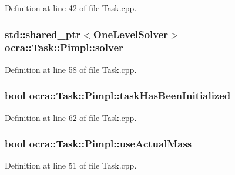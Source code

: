 Definition at line 42 of file Task.\+cpp.

\subsubsection[{\texorpdfstring{solver}{solver}}]{\setlength{\rightskip}{0pt plus 5cm}std\+::shared\+\_\+ptr$<${\bf One\+Level\+Solver}$>$ ocra\+::\+Task\+::\+Pimpl\+::solver}\hypertarget{structocra_1_1Task_1_1Pimpl_af1e09ed90ae5dee85e7fb5bd9d959df7}{}\label{structocra_1_1Task_1_1Pimpl_af1e09ed90ae5dee85e7fb5bd9d959df7}


Definition at line 58 of file Task.\+cpp.

\subsubsection[{\texorpdfstring{task\+Has\+Been\+Initialized}{taskHasBeenInitialized}}]{\setlength{\rightskip}{0pt plus 5cm}bool ocra\+::\+Task\+::\+Pimpl\+::task\+Has\+Been\+Initialized}\hypertarget{structocra_1_1Task_1_1Pimpl_a40e20271ee922933345e452f26569ac1}{}\label{structocra_1_1Task_1_1Pimpl_a40e20271ee922933345e452f26569ac1}


Definition at line 62 of file Task.\+cpp.

\subsubsection[{\texorpdfstring{use\+Actual\+Mass}{useActualMass}}]{\setlength{\rightskip}{0pt plus 5cm}bool ocra\+::\+Task\+::\+Pimpl\+::use\+Actual\+Mass}\hypertarget{structocra_1_1Task_1_1Pimpl_a33e37d9266902694f72be09c4c5db430}{}\label{structocra_1_1Task_1_1Pimpl_a33e37d9266902694f72be09c4c5db430}


Definition at line 51 of file Task.\+cpp.

